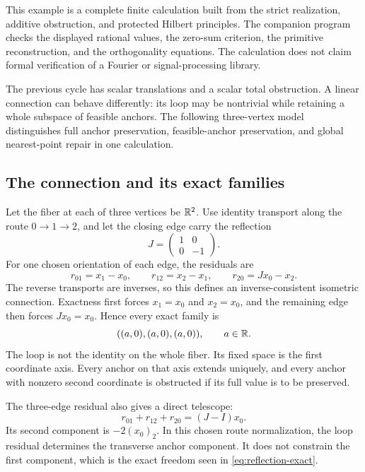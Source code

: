 This example is a complete finite calculation built from the strict realization, additive obstruction, and protected Hilbert principles. The companion program checks the displayed rational values, the zero-sum criterion, the primitive reconstruction, and the orthogonality equations. The calculation does not claim formal verification of a Fourier or signal-processing library.

\label{sec:twisted-loop}
The previous cycle has scalar translations and a scalar total obstruction. A linear connection can behave differently: its loop may be nontrivial while retaining a whole subspace of feasible anchors. The following three-vertex model distinguishes full anchor preservation, feasible-anchor preservation, and global nearest-point repair in one calculation.

\subsection{The connection and its exact families}
Let the fiber at each of three vertices be \(\mathbb R^2\). Use identity transport along the route \(0\to1\to2\), and let the closing edge carry the reflection
\[
 J=\begin{pmatrix}1&0\\0&-1\end{pmatrix}.
\]
For one chosen orientation of each edge, the residuals are
\[
 r_{01}=x_1-x_0,\qquad r_{12}=x_2-x_1,\qquad
 r_{20}=Jx_0-x_2.
\]
The reverse transports are inverses, so this defines an inverse-consistent isometric connection. Exactness first forces \(x_1=x_0\) and \(x_2=x_0\), and the remaining edge then forces \(Jx_0=x_0\). Hence every exact family is
\begin{equation}\label{eq:reflection-exact}
 ((a,0),(a,0),(a,0)),\qquad a\in\mathbb R.
\end{equation}
The loop is not the identity on the whole fiber. Its fixed space is the first coordinate axis. Every anchor on that axis extends uniquely, and every anchor with nonzero second coordinate is obstructed if its full value is to be preserved.

The three-edge residual also gives a direct telescope:
\[
 r_{01}+r_{12}+r_{20}=(J-I)x_0.
\]
Its second component is \(-2(x_0)_2\). In this chosen route normalization, the loop residual determines the transverse anchor component. It does not constrain the first component, which is the exact freedom seen in \eqref{eq:reflection-exact}.

